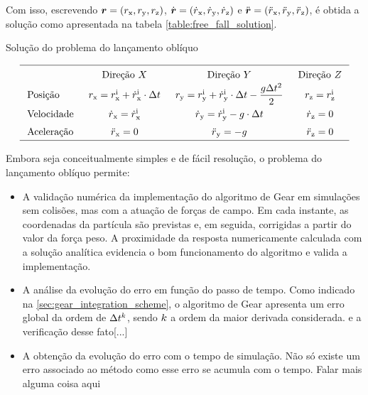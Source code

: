 Com isso, escrevendo \(\position = \explicitVectorCoordinates{\positionScalar}\), \(\velocity = \explicitVectorCoordinates{\velocityScalar}\) e \(\acceleration = \explicitVectorCoordinates{\accelerationScalar}\), é obtida a solução como apresentada na tabela \ref{table:free_fall_solution}.

\begin{table}[h]
	\caption{Solução do problema do lançamento oblíquo}
	\label{table:free_fall_solution}

	\begin{equation*}
		\arraycolsep=1.5\arraycolsep
		\def\arraystretch{1.5}
		\begin{array}{lccc}
	\hline
		& \text{Direção } \xAxis 
		& \text{Direção } \yAxis 
		& \text{Direção } \zAxis
		\\
	\text{Posição} 
		& \positionx = \initial{\positionx} + \initial{\velocityx}\cdot \Dt
		& \positiony = \initial{\positiony} + \initial{\velocityy}\cdot \Dt - \dfrac{\gravityScalar\Dt^2}{2}
		& \positionz = \initial{\positionz} \\
	\text{Velocidade} 
		& \velocityx = \initial{\velocityx}
		& \velocityy = \initial{\velocityy} - \gravityScalar\cdot \Dt
		& \velocityz = 0 \\
	\text{Aceleração} 
		& \accelerationx = 0
		& \accelerationy = - \gravityScalar
		& \accelerationz = 0 \\
	\hline	
		\end{array}
	\end{equation*}
\end{table}

Embora seja conceitualmente simples e de fácil resolução, o problema do lançamento oblíquo permite:
\begin{itemize}
\item A validação numérica da implementação do algoritmo de Gear em simulações sem colisões, mas com a atuação de forças de campo. Em cada instante, as coordenadas da partícula são previstas e, em seguida, corrigidas a partir do valor da força peso. A proximidade da resposta numericamente calculada com a solução analítica evidencia o bom funcionamento do algoritmo e valida a implementação.
\item A análise da evolução do erro em função do passo de tempo. Como indicado na \autoref{sec:gear_integration_scheme}, o algoritmo de Gear apresenta um erro global da ordem de \(\Delta t^k\), sendo \(k\) a ordem da maior derivada considerada. \alert{e a verificação desse fato[...]}
\item A obtenção da evolução do erro com o tempo de simulação. Não só existe um erro associado ao método como esse erro se acumula com o tempo. \alert{Falar mais alguma coisa aqui}
\end{itemize}



